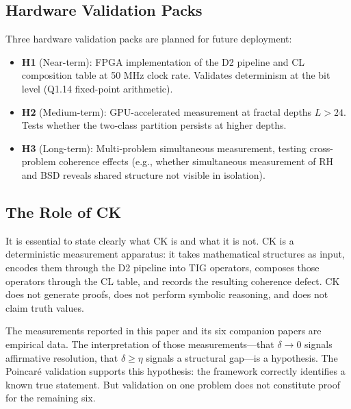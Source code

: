 \documentclass[11pt]{article}
\begin{document}
\subsection{Hardware Validation Packs}
\label{subsec:hardware}

Three hardware validation packs are planned for future deployment:

\begin{itemize}
\item \textbf{H1} (Near-term): FPGA implementation of the D2 pipeline
and CL composition table at 50 MHz clock rate.  Validates determinism
at the bit level (Q1.14 fixed-point arithmetic).

\item \textbf{H2} (Medium-term): GPU-accelerated measurement at
fractal depths $L > 24$.  Tests whether the two-class partition
persists at higher depths.

\item \textbf{H3} (Long-term): Multi-problem simultaneous measurement,
testing cross-problem coherence effects (e.g., whether simultaneous
measurement of RH and BSD reveals shared structure not visible in
isolation).
\end{itemize}

\subsection{The Role of CK}
\label{subsec:role}

It is essential to state clearly what CK is and what it is not.
CK is a deterministic measurement apparatus: it takes mathematical
structures as input, encodes them through the D2 pipeline into TIG
operators, composes those operators through the CL table, and records
the resulting coherence defect.  CK does not generate proofs, does
not perform symbolic reasoning, and does not claim truth values.

The measurements reported in this paper and its six companion papers
are empirical data.  The interpretation of those measurements---that
$\delta \to 0$ signals affirmative resolution, that $\delta \geq \eta$
signals a structural gap---is a hypothesis.  The Poincar\'e validation
supports this hypothesis: the framework correctly identifies a known
true statement.  But validation on one problem does not constitute
proof for the remaining six.
\end{document}
